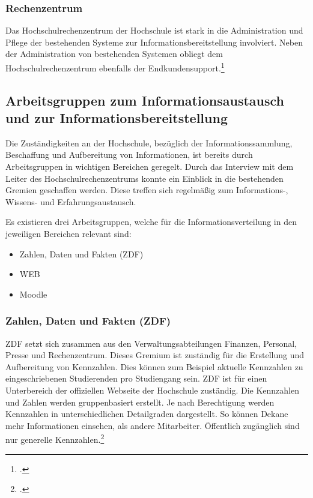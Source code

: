 \subsubsection{Rechenzentrum}
Das Hochschulrechenzentrum der Hochschule ist stark in die Administration und Pflege der bestehenden Systeme zur Informationsbereitstellung involviert. Neben der Administration von bestehenden Systemen obliegt dem Hochschulrechenzentrum ebenfalls der Endkundensupport.\footcite[Vgl.][]{gunter_muller_interview}

\subsection{Arbeitsgruppen zum Informationsaustausch und zur Informationsbereitstellung}
\label{subsection_arbeitsgruppen_informationsaustausch}
Die Zuständigkeiten an der Hochschule, bezüglich der Informationssammlung, Beschaffung und Aufbereitung von Informationen, ist bereits durch Arbeitsgruppen in wichtigen Bereichen geregelt. Durch das Interview mit dem Leiter des Hochschulrechenzentrums konnte ein Einblick in die bestehenden Gremien geschaffen werden. Diese treffen sich regelmäßig zum Informations-, Wissens- und Erfahrungsaustausch.

Es existieren drei Arbeitsgruppen, welche für die Informationsverteilung in den jeweiligen Bereichen relevant sind:

\begin{itemize}
	\item Zahlen, Daten und Fakten (ZDF)
	\item WEB
	\item Moodle
\end{itemize}

\subsubsection{Zahlen, Daten und Fakten (ZDF)}
ZDF setzt sich zusammen aus den Verwaltungsabteilungen Finanzen, Personal, Presse und Rechenzentrum. Dieses Gremium ist zuständig für die Erstellung und Aufbereitung von Kennzahlen. Dies können zum Beispiel aktuelle Kennzahlen zu eingeschriebenen Studierenden pro Studiengang sein.  ZDF ist für einen Unterbereich der offiziellen Webseite der Hochschule zuständig. Die Kennzahlen und Zahlen werden gruppenbasiert erstellt. Je nach Berechtigung werden Kennzahlen in unterschiedlichen Detailgraden dargestellt. So können Dekane mehr Informationen einsehen, als andere Mitarbeiter. Öffentlich zugänglich sind nur generelle Kennzahlen.\footcite[Vgl.][]{gunter_muller_interview}

